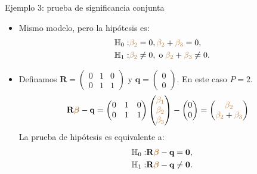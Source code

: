 \documentclass[10pt, xcolor=dvipsnames]{beamer}
\begin{document}
\begin{frame}{Ejemplo 3: prueba de significancia conjunta}
\begin{itemize}
    \item Mismo modelo, pero la hipótesis es: \vspace{-0.2cm}
    \begin{align*}
    \begin{split}
        \textcolor{black}{\mathbb{H}_{0}}:& \textcolor{brown}{\beta_2}=0, \textcolor{brown}{\beta_2} +\textcolor{brown}{\beta_3} = 0,  \\
        \textcolor{black}{\mathbb{H}_{1}}:& \textcolor{brown}{\beta_2}\neq0, \;  \text{o} \; \textcolor{brown}{\beta_2} + \textcolor{brown}{\beta_3} \neq 0.
    \end{split}
    \end{align*}
    \vspace{-0.0cm}
    	\item Definamos $\textbf{R} = \begin{pmatrix} 0 & 1 & 0 \\ 0&1&1 \end{pmatrix}$ y $\textbf{q}=\begin{pmatrix} 0 \\ 0 \end{pmatrix}$. En este caso $P=2$. \vspace{-0.2cm}
    \begin{align*}
    \begin{split}
        \textbf{R}\textcolor{brown}{\boldsymbol{\beta}} - \textbf{q} &= \begin{pmatrix} 0 & 1 & 0 \\ 0&1&1 \end{pmatrix} \begin{pmatrix} \textcolor{brown}{\beta_1} \\ \textcolor{brown}{\beta_2} \\ \textcolor{brown}{\beta_3} \end{pmatrix} -\begin{pmatrix} 0 \\ 0 \end{pmatrix} = \begin{pmatrix} \textcolor{brown}{\beta_2} \\ \textcolor{brown}{\beta_2} + \textcolor{brown}{\beta_3} \end{pmatrix} 
    \end{split}
    \end{align*}
    La prueba de hipótesis es equivalente a:
    \begin{align*}
    \begin{split}
        \textcolor{black}{\mathbb{H}_{0}}:& \textbf{R}\textcolor{brown}{\boldsymbol{\beta}} - \textbf{q} = \mathbf{0}, \\
        \textcolor{black}{\mathbb{H}_{1}}:& \textbf{R}\textcolor{brown}{\boldsymbol{\beta}} - \textbf{q} \neq \mathbf{0}.
    \end{split}
    \end{align*}
\end{itemize}
\end{frame}
\end{document}
